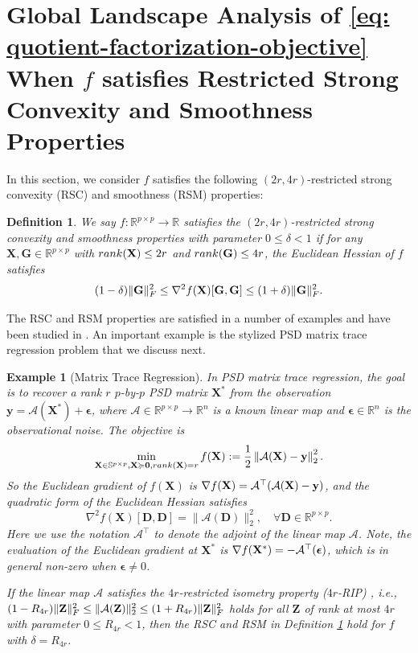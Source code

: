 \documentclass[11pt]{article}
\newtheorem{Example}{Example}
\newtheorem{Definition}{Definition}
\newcommand{\bbR}{\mathbb{R}}
\newcommand{\cA}{{\mathcal{A}}}
\newcommand{\0}{{\mathbf{0}}}
\newcommand{\1}{{\mathbf{1}}}
\newcommand{\y}{{\mathbf{y}}}
\newcommand{\X}{{\mathbf{X}}}
\newcommand{\D}{{\mathbf{D}}}
\newcommand{\Z}{{\mathbf{Z}}}
\newcommand{\G}{{\mathbf{G}}}
\newcommand{\bepsilon}{{\boldsymbol{\epsilon}}}
\newcommand{\rank}{{\rm rank}}
\newcommand{\F}{{\rm F}}
\newcommand{\nc}{\normalcolor}
\begin{document}
\section{Global Landscape Analysis of \eqref{eq: quotient-factorization-objective} When $f$ satisfies Restricted Strong Convexity and Smoothness Properties } \label{sec: landscape-analysis-f-well-conditioned}
In this section, we consider $f$ satisfies the following $(2r,4r)$-restricted strong convexity (RSC) and smoothness (RSM) properties:
\begin{Definition} \label{def: RSC-RSM}
We say $f: \bbR^{p \times p}\to \bbR$ satisfies the $(2r,4r)$-restricted strong convexity and smoothness properties with parameter $0 \leq \delta < 1$ if for any $\X,\G \in \bbR^{p \times p}$ with $\rank(\X) \leq 2r$ and $\rank(\G) \leq 4r$, the Euclidean Hessian of $f$ satisfies
\begin{equation} \label{eq: RSC-RSM} (1-\delta) \|\G\|_\F^2 \leq \nabla^2 f(\X)[\G,\G] \leq (1+\delta) \|\G\|_\F^2.
\end{equation} 
\end{Definition}

The RSC and RSM properties are satisfied in a number of examples and have been studied in \cite{wang2017unified,zhu2018global,zhu2017global,li2019non}. An important example is the stylized PSD matrix trace regression problem that we discuss next.
\begin{Example}[Matrix Trace Regression] \label{em: matrix-trace-regression}
	In PSD matrix trace regression, the goal is to recover a rank $r$ $p$-by-$p$ PSD matrix $\X^*$ from the observation $\y = \cA(\X^*) + \bepsilon$, where $\mathcal{A}\in \mathbb{R}^{p\times p} \to \mathbb{R}^n$ is a known linear map and $\bepsilon \in \bbR^n$ is the observational noise. The objective is 
	\begin{equation*} %
\min_{\X \in \mathbb{S}^{p\times p}, \X \succcurlyeq \0, \rank(\X) = r } f(\X) := \frac{1}{2} \left\| \mathcal{A}(\X) - \y \right\|_2^2.
\end{equation*}So the Euclidean gradient of $f(\X)$ is $\nabla f(\X) = \cA^{ \top \nc } (\cA(\X)-\y)$, and the quadratic form of the Euclidean Hessian satisfies 
\begin{equation*}
	\nabla^2 f(\X)[\D,\D] = \|\cA(\D)\|_2^2, \quad \forall \D \in \bbR^{p \times p}.
\end{equation*} Here we use the notation $\cA^\top$ to denote the adjoint of the linear map $\cA$. Note, the evaluation of the Euclidean gradient at $\X^*$ is $\nabla f(\X^*) = -\cA^{\top \nc}( \bepsilon )$, which is in general non-zero when $\bepsilon \neq 0$.

If the linear map $\cA$ satisfies the $4r$-restricted isometry property ($4r$-RIP) \cite{candes2010tight}, i.e., $(1-R_{4r}) \|\Z\|^2_\F \leq \|\cA(\Z)\|_2^2 \leq (1+R_{4r}) \|\Z\|_\F^2$ holds for all $\Z$ of rank at most $4r$ with parameter $ 0\leq R_{4r} < 1$, then the RSC and RSM in Definition \ref{def: RSC-RSM} hold for $f$ with $\delta = R_{4r}$. 
\end{Example}
\end{document}
